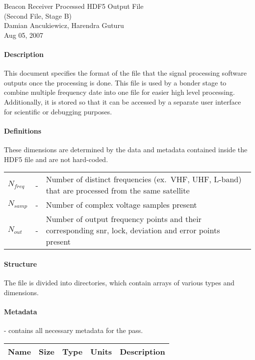 \documentclass[12pt]{article}
\begin{document}
\begin{center}
\Large{Beacon Receiver Processed HDF5 Output File}\\
\large{(Second File, Stage B)}\\
\large{Damian Ancukiewicz, Harendra Guturu}\\
\large{Aug 05, 2007}
\end{center}

\begin{small}
\paragraph{Description}
This document specifies the format of the file that the signal processing
software outputs once the processing is done. This file is used by a bonder stage to combine
multiple frequency date into one file for easier high level processing. Additionally, it is stored so that it can be accessed by a separate user interface for scientific or debugging purposes.
\paragraph{Definitions}
These dimensions are determined by the data and metadata contained inside the HDF5 file and are not hard-coded.\\

\begin{tabular}{l c p{10cm}}
$N_{freq}$ &-& Number of distinct frequencies (ex.~VHF, UHF, L-band) that are processed from the same satellite \\
$N_{samp}$ &-& Number of complex voltage samples present\\
$N_{out}$ &-& Number of output frequency points and their corresponding snr, lock, deviation and error points present\\
\end{tabular}

\paragraph{Structure}
The file is divided into directories, which contain arrays of various types and dimensions. 

\paragraph{Metadata}- contains all necessary metadata for the pass.\\
\begin{scriptsize}
\begin{tabular}{|l|l|l|c|p{7cm}|}
\hline
\textbf{Name} & \textbf{Size} & \textbf{Type} & \textbf{Units} & \textbf{Description} \\
\hline


\end{tabular}
\end{scriptsize}
\end{small}
\end{document}
